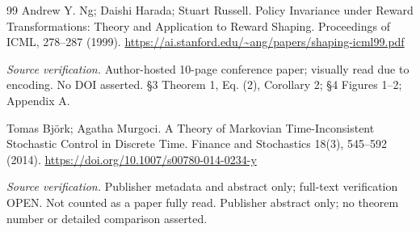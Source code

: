 \documentclass[11pt,a4paper]{article}
\theoremstyle{plain}
\theoremstyle{definition}
\begin{document}
\begin{thebibliography}{99}
 Andrew Y. Ng; Daishi Harada; Stuart Russell. Policy Invariance under Reward Transformations: Theory and Application to Reward Shaping. Proceedings of ICML, 278--287 (1999). \url{https://ai.stanford.edu/~ang/papers/shaping-icml99.pdf}
\par\smallskip\noindent\emph{Source verification.} Author-hosted 10-page conference paper; visually read due to encoding. No DOI asserted. \S{}3 Theorem 1, Eq. (2), Corollary 2; \S{}4 Figures 1--2; Appendix A.

 Tomas Björk; Agatha Murgoci. A Theory of Markovian Time-Inconsistent Stochastic Control in Discrete Time. Finance and Stochastics 18(3), 545--592 (2014). \url{https://doi.org/10.1007/s00780-014-0234-y}
\par\smallskip\noindent\emph{Source verification.} Publisher metadata and abstract only; full-text verification OPEN. Not counted as a paper fully read. Publisher abstract only; no theorem number or detailed comparison asserted.

\end{thebibliography}
\end{document}
